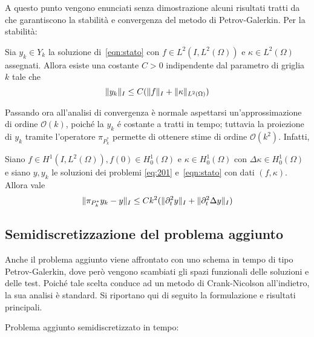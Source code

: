 A questo punto vengono enunciati senza dimostrazione alcuni risultati tratti da \cite{MAIN} che garantiscono la stabilità e convergenza del metodo di Petrov-Galerkin. Per la stabilità:
 \begin{lemma} 
 \label{stab:stato}
 Sia $y_k\in Y_k$ la soluzione di~\eqref{eqn:stato} con $f\in L^2(I,L^2(\Omega))$ e $\kappa\in L^2(\Omega)$ assegnati. Allora esiste una costante $C>0$ indipendente dal parametro di griglia $k$ tale che
 \[
 \lVert y_k\rVert_I\le C(\lVert f\rVert_I + \lVert\kappa\rVert_{L^2(\Omega)})
 \]
\end{lemma}
 Passando ora all'analisi di convergenza è normale aspettarsi un'approssimazione di ordine $\mathcal{O}(k)$, poiché la $y_k$ é costante a tratti in tempo; tuttavia la proiezione di $y_k$ tramite l'operatore $\pi_{P^*_k}$ permette di ottenere stime di ordine $\mathcal{O}(k^2)$. Infatti,
 \begin{lemma} 
 \label{conv:stato}
 Siano $f\in H^1(I,L^2(\Omega)),f(0)\in H^1_0(\Omega)$ e $\kappa\in H^1_0(\Omega)$ con $\Delta\kappa\in H^1_0(\Omega)$ e siano $y,y_k$ le soluzioni dei problemi \ref{eq:201} e~\eqref{eqn:stato} con dati $(f,\kappa)$. Allora vale
 \[
 \lVert\pi_{P^*_k}y_k-y\rVert_I\le Ck^2(\lVert\partial^2_t y\rVert_I + \lVert\partial^2_t \Delta y\rVert_I)
 \]
 \end{lemma}

\subsection{Semidiscretizzazione del problema aggiunto}
Anche il problema aggiunto viene affrontato con uno schema in tempo di tipo Petrov-Galerkin, dove però vengono scambiati gli spazi funzionali delle soluzioni e delle test. Poiché tale scelta conduce ad un metodo di Crank-Nicolson all'indietro, la sua analisi è standard. Si riportano qui di seguito la formulazione e risultati principali.

Problema aggiunto semidiscretizzato in tempo:

